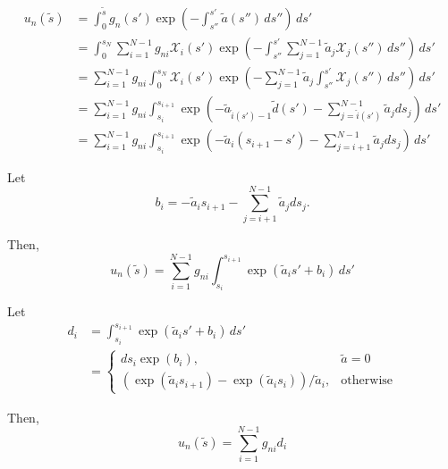 \begin{align}
  u_n(\tilde{s}) &= \int_0^{\tilde{s}}g_n(s')\exp\left( -\int_{s''}^{s'}\tilde{a}(s'')\,ds'' \right)\, ds' \\
  &= \int_0^{s_N} \sum_{i=1}^{N-1}g_{ni}\mathcal{X}_i(s') \exp\left( -\int_{s''}^{s'}\sum_{j=1}^{N-1}\tilde{a}_{j}\mathcal{X}_j(s'')\,ds'' \right)\, ds' \\
  &= \sum_{i=1}^{N-1}g_{ni}\int_0^{s_N} \mathcal{X}_i(s') \exp\left( -\sum_{j=1}^{N-1}\tilde{a}_{j}\int_{s''}^{s'}\mathcal{X}_j(s'')\,ds'' \right)\, ds' \\
  &= \sum_{i=1}^{N-1}g_{ni}\int_{s_i}^{s_{i+1}}  \exp\left(-\tilde{a}_{\hat{i}(s')-1}\tilde{d}(s') -\sum_{j=\hat{i}(s')}^{N-1}\tilde{a}_{j}ds_j\right)\, ds' \\
  &= \sum_{i=1}^{N-1}g_{ni}\int_{s_i}^{s_{i+1}}  \exp\left(-\tilde{a}_{i}(s_{i+1}-s') -\sum_{j=i+1}^{N-1}\tilde{a}_{j}ds_j\right)\, ds'
\end{align}

Let
\begin{equation}
  b_i = -\tilde{a}_{i}s_{i+1} - \sum_{j=i+1}^{N-1}\tilde{a}_{j}ds_j.
\end{equation}

Then,
\begin{equation}
  u_n(\tilde{s}) = \sum_{i=1}^{N-1}g_{ni}\int_{s_i}^{s_{i+1}}  \exp\left(\tilde{a}_{i}s' +b_i\right)\, ds'
\end{equation}

Let
\begin{align}
  d_i &= \int_{s_i}^{s_{i+1}}  \exp\left(\tilde{a}_{i}s' +b_i\right)\, ds' \\
    &= \begin{cases}
    ds_i \exp(b_i), & \tilde{a} = 0 \\
      \left( \exp(\tilde{a}_i s_{i+1}) - \exp(\tilde{a}_i s_i) \right)/\tilde{a}_i, & \mbox{otherwise}
    \end{cases}
\end{align}

Then,
\begin{equation}
  u_n(\tilde{s}) = \sum_{i=1}^{N-1} g_{ni}d_i
\end{equation}